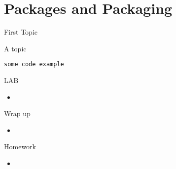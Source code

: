 \documentclass{beamer}
\begin{document}
\section{Packages and Packaging}

\begin{frame}[fragile]{First Topic}

 {\Large A topic}

\begin{verbatim}
some code example
\end{verbatim}

\end{frame} 

\begin{frame}{LAB}

\begin{itemize}
  \item
\end{itemize}

\end{frame}

\begin{frame}{Wrap up}

\begin{itemize}
  \item
\end{itemize}

\end{frame}



\begin{frame}{Homework}

\begin{itemize}
  \item
\end{itemize}

\end{frame}
\end{document}
